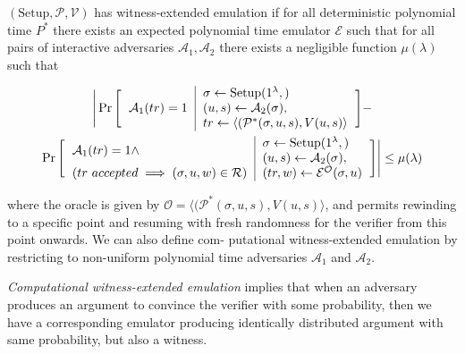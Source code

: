 \begin{defn}
    $(\text{Setup}, \mathcal{P}, \mathcal{V})$ has witness-extended
    emulation if for all deterministic polynomial time $P^{*}$ there exists an expected polynomial time
    emulator $\mathcal{E}$ such that for all pairs of interactive adversaries $\mathcal{A}_1 , \mathcal{A}_2$ there exists a negligible function
    $\mu (\lambda)$ such that
    
    \begin{multline*}
    \Bigg|
        \Pr
        \Bigg[
        \begin{tabular}{c | l}
             \multirow{3}{*}{$\mathcal{A}_1(tr) = 1$}
             & $\sigma \leftarrow \text{Setup}(1^{\lambda},)$
             \\
             & 
             $(u, s) \leftarrow \mathcal{A}_2(\sigma),$
             \\
             & $tr \leftarrow \langle (\mathcal{P}^{*}(\sigma, u, s), V(u, s) \rangle$
        \end{tabular}
        \Bigg]
        -\\
        \Pr 
        \Bigg[
            \begin{tabular}{l | l}
                \multirow{2}{*}{$\mathcal{A}_1(tr) = 1 \wedge$}
                &
                $\sigma \leftarrow \text{Setup}(1^{\lambda},)$
                \\
                & 
                $(u, s) \leftarrow \mathcal{A}_2(\sigma),$
                \\
                $(tr\ accepted \implies (\sigma, u, w)\in \mathcal{R})$
                &
                $(tr, w) \leftarrow \mathcal{E}^{\mathcal{O}}(\sigma, u)$
           \end{tabular}
           \Bigg]
    \Bigg|
    \leq \mu(\lambda)
    \end{multline*}
    
    where the oracle is given by  $\mathcal{O} = \langle (\mathcal{P}^{*}(\sigma, u, s), V(u, s) \rangle$, and permits rewinding to a specific point and
    resuming with fresh randomness for the verifier from this point onwards. We can also define com-
    putational witness-extended emulation by restricting to non-uniform polynomial time adversaries
    $\mathcal{A}_1$ and $\mathcal{A}_2$.       
    
\end{defn}

\textit{Computational witness-extended emulation} implies that when an adversary produces an argument to convince the verifier with some probability, then we have a corresponding emulator producing identically distributed argument with same probability, but also a witness.

